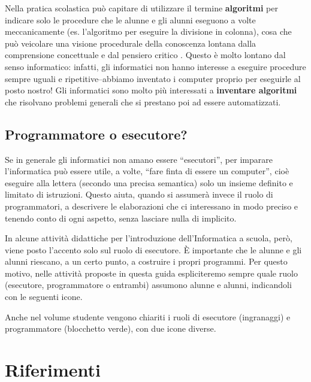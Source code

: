 Nella pratica scolastica può capitare di utilizzare il termine \textbf{algoritmi} per indicare solo le procedure che le alunne e gli alunni eseguono a volte meccanicamente (es. l'algoritmo per eseguire la divisione in colonna), cosa che può veicolare una visione procedurale della conoscenza lontana dalla comprensione concettuale e dal pensiero critico \parencite{crippa-etal-2025}. Questo è molto lontano dal senso informatico: infatti, gli informatici non hanno interesse a eseguire procedure sempre uguali e ripetitive--abbiamo inventato i computer proprio per eseguirle al posto nostro! Gli informatici sono molto più interessati a \textbf{inventare algoritmi} che risolvano problemi generali che si prestano poi ad essere automatizzati.


\subsection{Programmatore o esecutore?}


Se in generale gli informatici non amano essere ``esecutori'', per imparare l'informatica può essere utile, a volte, ``fare finta di essere un computer'', cioè eseguire alla lettera (secondo una precisa semantica) solo un insieme definito e limitato di istruzioni. Questo aiuta, quando si assumerà invece il ruolo di programmatori, a descrivere le elaborazioni che ci interessano in modo preciso e tenendo conto di ogni aspetto, senza lasciare nulla di implicito.

In alcune attività didattiche per l'introduzione dell'Informatica a scuola, però, viene posto l'accento solo sul ruolo di esecutore. È importante che le alunne e gli alunni riescano, a un certo punto, a costruire i propri programmi. Per questo motivo, nelle attività proposte in questa guida espliciteremo sempre quale ruolo (esecutore, programmatore o entrambi) assumono alunne e alunni, indicandoli con le seguenti icone.

\begin{center}
\ruoloProgrammatore\qquad\ruoloEsecutore
\end{center}

\begin{rimandiquaderno}
Anche nel volume studente vengono chiariti i ruoli di esecutore (ingranaggi) e programmatore (blocchetto verde), con due icone diverse.
\end{rimandiquaderno}

\section{Riferimenti}\label{riferimenti-1}

\printbibliography[heading=none,keyword={cap2},notcategory={attivita}]
